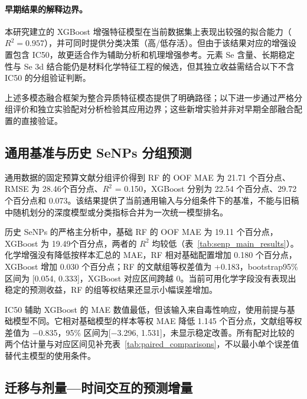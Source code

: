 \paragraph{早期结果的解释边界。}
本研究建立的 XGBoost 增强特征模型在当前数据集上表现出较强的拟合能力（$R^2=0.957$），并可同时提供分类决策（高/低存活）。但由于该结果对应的增强设置包含 IC50，故更适合作为辅助分析和机理增强参考。元素 Se 含量、长期稳定性与 Se 3d 结合能仍是材料化学特征工程的候选，但其独立收益需结合以下不含 IC50 的分组验证判断。

上述多模态融合框架为整合异质特征模态提供了明确路径；以下进一步通过严格分组评价和独立实验配对分析检验其应用边界；这些新增实验并非对早期全部融合配置的直接验证。



\subsection{通用基准与历史 SeNPs 分组预测}

通用数据的固定预算文献分组评价得到 RF 的 OOF MAE 为 21.71 个百分点、RMSE 为 28.46个百分点、$R^2$ = 0.150，XGBoost 分别为 22.54 个百分点、29.72 个百分点和 0.073。该结果提供了当前通用输入与分组条件下的基准，不能与旧稿中随机划分的深度模型或分类指标合并为一次统一模型排名。

历史 SeNPs 的严格主分析中，基础 RF 的 OOF MAE 为 19.11 个百分点，XGBoost 为 19.49个百分点，两者的 $R^2$ 均较低（表~\ref{tab:senp_main_results}）。化学增强没有降低按样本汇总的 MAE，RF 相对基础配置增加 0.180 个百分点，XGBoost 增加 0.030 个百分点；RF 的文献组等权差值为 +0.183，bootstrap95\% 区间为 [0.054, 0.333]，XGBoost 对应区间跨越 0。当前可用化学字段没有表现出稳定的预测收益，RF 的组等权结果还显示小幅误差增加。

\begin{table}[H]
\centering
\caption{434 条历史 SeNPs 记录的 5 折外层、3 折内层文献分组评价。指标由外层 OOF 预测计算，IC50 辅助配置单列。}
\label{tab:senp_main_results}
\small

\end{table}

IC50 辅助 XGBoost 的 MAE 数值最低，但该输入来自毒性响应，使用前提与基础模型不同。它相对基础模型的样本等权 MAE 降低 1.145 个百分点，文献组等权差值为 \ensuremath{\mathord{-}}0.835，95\% 区间为[\ensuremath{\mathord{-}}3.296, 1.531]，未显示稳定改善。所有配对比较的两个估计量与对应区间见补充表~\ref{tab:paired_comparisons}，不以最小单个误差值替代主模型的使用条件。

\subsection{迁移与剂量—时间交互的预测增量}


